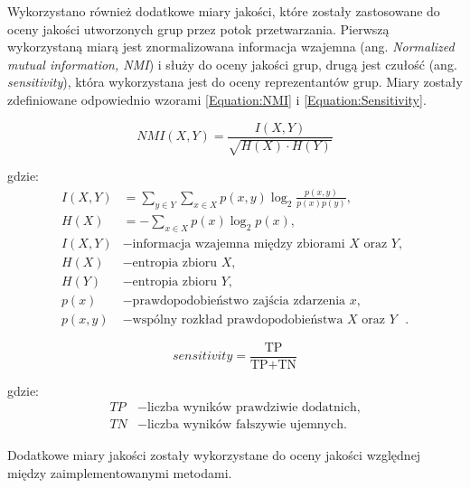         Wykorzystano również dodatkowe miary jakości, które zostały zastosowane do oceny jakości utworzonych grup przez potok przetwarzania. Pierwszą wykorzystaną miarą jest znormalizowana informacja wzajemna (ang. \textit{Normalized mutual information, NMI}) i służy do oceny jakości grup, drugą jest czułość (ang. \textit{sensitivity}), która wykorzystana jest do oceny reprezentantów grup. Miary zostały zdefiniowane odpowiednio wzorami \eqref{Equation:NMI} i \eqref{Equation:Sensitivity}.

        \begin{equation}
            NMI(X, Y) = \frac{I(X, Y)}{\sqrt{H(X) \cdot H(Y)}}
            \label{Equation:NMI}
        \end{equation}

        gdzie:
        \begin{align*}
            I(X, Y) &= \sum_{y \in Y}{ \sum_{x \in X}{p(x, y) \log_{2}{\frac{p(x, y)}{p(x) p(y)}}}}, \\
            H(X) &= - \sum_{x \in X}{ p(x) \log_{2}{p(x)}}, \\
            I(X, Y) &- \text{informacja wzajemna między zbiorami $X$ oraz $Y$}, \\
            H(X) &- \text{entropia zbioru $X$}, \\
            H(Y) &- \text{entropia zbioru $Y$}, \\
            p(x) &- \text{prawdopodobieństwo zajścia zdarzenia $x$}, \\
            p(x, y) &- \text{wspólny rozkład prawdopodobieństwa $X$ oraz $Y$ }.
        \end{align*}

        \begin{equation}
            sensitivity = \frac{\text{TP}}{
                \text{TP} + \text{TN}
            }
            \label{Equation:Sensitivity}
        \end{equation}

        gdzie:
        \begin{align*}
            TP &- \text{liczba wyników prawdziwie dodatnich,} \\
            TN &- \text{liczba wyników fałszywie ujemnych.}
        \end{align*}

        Dodatkowe miary jakości zostały wykorzystane do oceny jakości względnej między zaimplementowanymi metodami.

